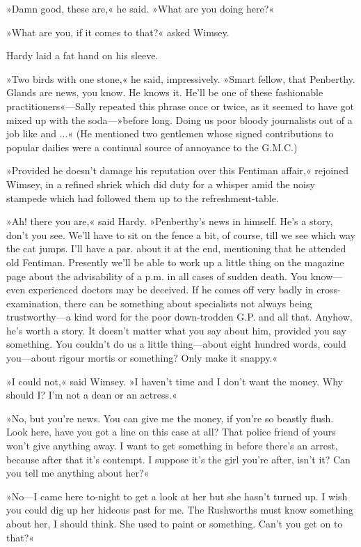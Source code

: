 »Damn good, these are,« he said. »What are you doing here?«

»What are you, if it comes to that?« asked Wimsey.

Hardy laid a fat hand on his sleeve.

»Two birds with one stone,« he said, impressively. »Smart fellow, that Penberthy. Glands are news, you know. He knows it. He'll be one of these fashionable practitioners«—Sally repeated this phrase once or twice, as it seemed to have got mixed up with the soda—»before long. Doing us poor bloody journalists out of a job like \textellipsis  and ...« (He mentioned two gentlemen whose signed contributions to popular dailies were a continual source of annoyance to the G.M.C.)

»Provided he doesn't damage his reputation over this Fentiman affair,« rejoined Wimsey, in a refined shriek which did duty for a whisper amid the noisy stampede which had followed them up to the refreshment-table.

»Ah! there you are,« said Hardy. »Penberthy's news in himself. He's a story, don't you see. We'll have to sit on the fence a bit, of course, till we see which way the cat jumps. I'll have a par. about it at the end, mentioning that he attended old Fentiman. Presently we'll be able to work up a little thing on the magazine page about the advisability of a p.m. in all cases of sudden death. You know—even experienced doctors may be deceived. If he comes off very badly in cross-examination, there can be something about specialists not always being trustworthy—a kind word for the poor down-trodden G.P. and all that. Anyhow, he's worth a story. It doesn't matter what you say about him, provided you say something. You couldn't do us a little thing—about eight hundred words, could you—about rigour mortis or something? Only make it snappy.«

»I could not,« said Wimsey. »I haven't time and I don't want the money. Why should I? I'm not a dean or an actress.«

»No, but you're news. You can give me the money, if you're so beastly flush. Look here, have you got a line on this case at all? That police friend of yours won't give anything away. I want to get something in before there's an arrest, because after that it's contempt. I suppose it's the girl you're after, isn't it? Can you tell me anything about her?«

»No—I came here to-night to get a look at her but she hasn't turned up. I wish you could dig up her hideous past for me. The Rushworths must know something about her, I should think. She used to paint or something. Can't you get on to that?«

